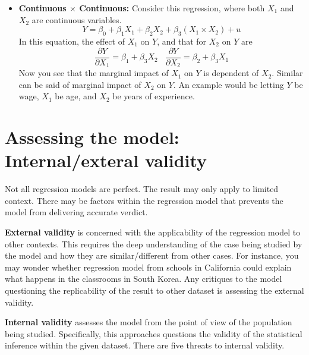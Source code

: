 \documentclass[12pt]{article}
\theoremstyle{definition}
\theoremstyle{property}
\theoremstyle{assumption}
\theoremstyle{example}
\theoremstyle{comment}
\begin{document}
\begin{itemize}
\item \textbf{Continuous $\times$ Continuous: } Consider this regression, where both $X_1$ and $X_2$ are continuous variables. 
\[
Y = \beta_0 + \beta_1X_1 + \beta_2 X_2 + \beta_3 (X_1\times X_2)+u
\] 
In this equation, the effect of $X_1$ on $Y$, and that for $X_2$ on $Y$ are
\[
\frac{\partial Y}{\partial X_1} = \beta_1 + \beta_3 X_2 \ \ \ \ \frac{\partial Y}{\partial X_2} = \beta_2 + \beta_3 X_1 
\]
Now you see that the marginal impact of $X_1$ on $Y$ is dependent of $X_2$. Similar can be said of marginal impact of $X_2$ on $Y$. An example would be letting $Y$ be wage, $X_1$ be age, and $X_2$ be years of experience. \par\medskip
\end{itemize}



\section{Assessing the model: Internal/exteral validity}
Not all regression models are perfect. The result may only apply to limited context. There may be factors within the regression model that prevents the model from delivering accurate verdict. \par\medskip
\textbf{External validity} is concerned with the applicability of the regression model to other contexts. This requires the deep understanding of the case being studied by the model and how they are similar/different from other cases. For instance, you may wonder whether regression model from schools in California could explain what happens in the classrooms in South Korea. Any critiques to the model questioning the replicability of the result to other dataset is assessing the external validity. \par\medskip
\textbf{Internal validity} assesses the model from the point of view of the population being studied. Specifically, this approaches questions the validity of the statistical inference within the given dataset. There are five threats to internal validity.
\end{document}
